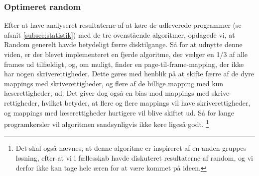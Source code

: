 	\subsubsection{Optimeret random}
	Efter at have analyseret resultaterne af at køre de udleverede programmer (se afsnit \ref{subsec:statistik}) med de tre ovenstående algoritmer, opdagede vi, at Random generelt havde betydeligt færre disktilgange. Så for at udnytte denne viden, er der blevet implementeret en fjerde algoritme, der vælger en 1/3 af alle frames ud tilfældigt, og, om muligt, finder en page-til-frame-mapping, der ikke har nogen skriverettigheder. Dette gøres med henblik på at skifte færre af de dyre mappings med skriverettigheder, og flere af de billige mapping med kun læserettigheder, ud. Det giver dog også en bias mod mappings med skrive-rettigheder, hvilket betyder, at flere og flere mappings vil have skriverettigheder, og mappings med læserettigheder hurtigere vil blive skiftet ud. Så for lange programkørsler vil algoritmen sandsynligvis ikke køre ligeså godt. \footnote{Det skal også nævnes, at denne algoritme er inspireret af en anden gruppes løsning, efter at vi i fællesskab havde diskuteret resultaterne af random, og vi derfor ikke kan tage hele æren for at være kommet på ideen.}
